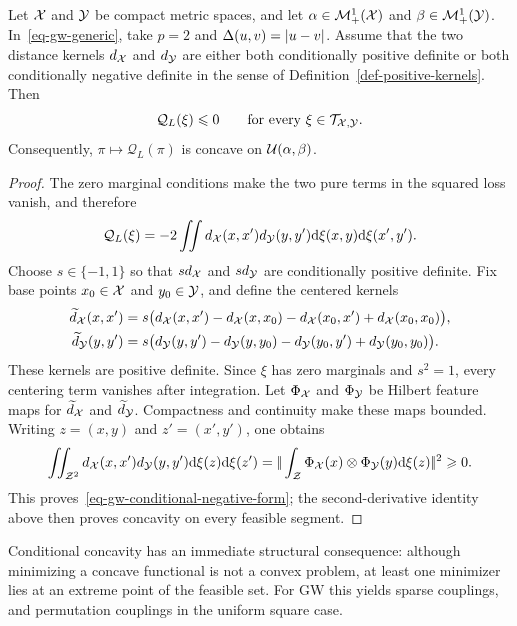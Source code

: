 \begin{prop}\label{prop-gw-conditional-concavity}
	Let $\mathcal{X}$ and $\mathcal{Y}$ be compact metric spaces, and let $\alpha\in\mathcal{M}_+^1(\mathcal{X})$ and $\beta\in\mathcal{M}_+^1(\mathcal{Y})$. In~\eqref{eq-gw-generic}, take $p=2$ and $\Delta(u,v)=|u-v|$. Assume that the two distance kernels $d_{\mathcal{X}}$ and $d_{\mathcal{Y}}$ are either both conditionally positive definite or both conditionally negative definite in the sense of Definition~\ref{def-positive-kernels}. Then
	\begin{equation}\label{eq-gw-conditional-negative-form}
		\mathcal Q_L(\xi)\leqslant0
		\qquad\text{for every }\xi\in\mathcal T_{\mathcal{X},\mathcal{Y}}.
	\end{equation}
	Consequently, $\pi\mapsto\mathcal Q_L(\pi)$ is concave on $\mathcal{U}(\alpha,\beta)$.
\end{prop}
\begin{proof}
	The zero marginal conditions make the two pure terms in the squared loss vanish, and therefore
	\[
		\mathcal Q_L(\xi)
		=
		-2\iint d_{\mathcal{X}}(x,x')d_{\mathcal{Y}}(y,y')\mathrm{d}\xi(x,y)\mathrm{d}\xi(x',y').
	\]
	Choose $s\in\{-1,1\}$ so that $sd_{\mathcal{X}}$ and $sd_{\mathcal{Y}}$ are conditionally positive definite. Fix base points $x_0\in\mathcal{X}$ and $y_0\in\mathcal{Y}$, and define the centered kernels
	\begin{align*}
		\widetilde{d}_{\mathcal{X}}(x,x')
		&=s\bigl(d_{\mathcal{X}}(x,x')-d_{\mathcal{X}}(x,x_0)-d_{\mathcal{X}}(x_0,x')+d_{\mathcal{X}}(x_0,x_0)\bigr),\\
		\widetilde{d}_{\mathcal{Y}}(y,y')
		&=s\bigl(d_{\mathcal{Y}}(y,y')-d_{\mathcal{Y}}(y,y_0)-d_{\mathcal{Y}}(y_0,y')+d_{\mathcal{Y}}(y_0,y_0)\bigr).
	\end{align*}
	These kernels are positive definite. Since $\xi$ has zero marginals and $s^2=1$, every centering term vanishes after integration. Let $\Phi_{\mathcal{X}}$ and $\Phi_{\mathcal{Y}}$ be Hilbert feature maps for $\widetilde{d}_{\mathcal{X}}$ and $\widetilde{d}_{\mathcal{Y}}$. Compactness and continuity make these maps bounded. Writing $z=(x,y)$ and $z'=(x',y')$, one obtains
	\[
		\iint_{\mathcal Z^2}d_{\mathcal{X}}(x,x')d_{\mathcal{Y}}(y,y')\mathrm{d}\xi(z)\mathrm{d}\xi(z')
		=
		|\!| \int_{\mathcal Z}\Phi_{\mathcal{X}}(x)\otimes\Phi_{\mathcal{Y}}(y)\mathrm{d}\xi(z) |\!|^2
		\geqslant0.
	\]
	This proves~\eqref{eq-gw-conditional-negative-form}; the second-derivative identity above then proves concavity on every feasible segment.
\end{proof}

Conditional concavity has an immediate structural consequence: although minimizing a concave functional is not a convex problem, at least one minimizer lies at an extreme point of the feasible set. For GW this yields sparse couplings, and permutation couplings in the uniform square case.


